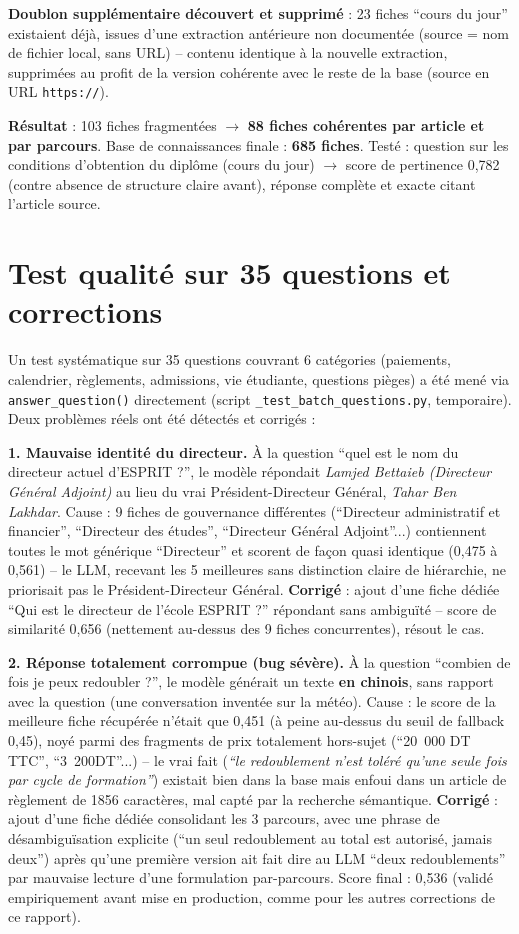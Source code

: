 \documentclass[11pt,a4paper]{report}
\begin{document}
\textbf{Doublon supplémentaire découvert et supprimé} : 23 fiches ``cours du jour''
existaient déjà, issues d'une extraction antérieure non documentée (source = nom de
fichier local, sans URL) -- contenu identique à la nouvelle extraction, supprimées au
profit de la version cohérente avec le reste de la base (source en URL \texttt{https://}).

\textbf{Résultat} : 103 fiches fragmentées $\to$ \textbf{88 fiches cohérentes par
article et par parcours}. Base de connaissances finale : \textbf{685 fiches}. Testé :
question sur les conditions d'obtention du diplôme (cours du jour) $\to$ score de
pertinence 0,782 (contre absence de structure claire avant), réponse complète et exacte
citant l'article source.

\section{Test qualité sur 35 questions et corrections}
\label{sec:test-qualite-35}
Un test systématique sur 35 questions couvrant 6 catégories (paiements, calendrier,
règlements, admissions, vie étudiante, questions pièges) a été mené via
\texttt{answer\_question()} directement (script \texttt{\_test\_batch\_questions.py},
temporaire). Deux problèmes réels ont été détectés et corrigés :

\textbf{1. Mauvaise identité du directeur.} À la question ``quel est le nom du directeur
actuel d'ESPRIT ?'', le modèle répondait \emph{Lamjed Bettaieb (Directeur Général
Adjoint)} au lieu du vrai Président-Directeur Général, \emph{Tahar Ben Lakhdar}. Cause :
9 fiches de gouvernance différentes (``Directeur administratif et financier'',
``Directeur des études'', ``Directeur Général Adjoint''...) contiennent toutes le mot
générique ``Directeur'' et scorent de façon quasi identique (0,475 à 0,561) -- le LLM,
recevant les 5 meilleures sans distinction claire de hiérarchie, ne priorisait pas le
Président-Directeur Général. \textbf{Corrigé} : ajout d'une fiche dédiée ``Qui est le
directeur de l'école ESPRIT ?'' répondant sans ambiguïté -- score de similarité 0,656
(nettement au-dessus des 9 fiches concurrentes), résout le cas.

\textbf{2. Réponse totalement corrompue (bug sévère).} À la question ``combien de fois
je peux redoubler ?'', le modèle générait un texte \textbf{en chinois}, sans rapport
avec la question (une conversation inventée sur la météo). Cause : le score de la
meilleure fiche récupérée n'était que 0,451 (à peine au-dessus du seuil de fallback
0,45), noyé parmi des fragments de prix totalement hors-sujet (``20~000 DT TTC'',
``3~200DT''...) -- le vrai fait (\emph{``le redoublement n'est toléré qu'une seule fois
par cycle de formation''}) existait bien dans la base mais enfoui dans un article de
règlement de 1856 caractères, mal capté par la recherche sémantique. \textbf{Corrigé} :
ajout d'une fiche dédiée consolidant les 3 parcours, avec une phrase de désambiguïsation
explicite (``un seul redoublement au total est autorisé, jamais deux'') après qu'une
première version ait fait dire au LLM ``deux redoublements'' par mauvaise lecture d'une
formulation par-parcours. Score final : 0,536 (validé empiriquement avant mise en
production, comme pour les autres corrections de ce rapport).
\end{document}
